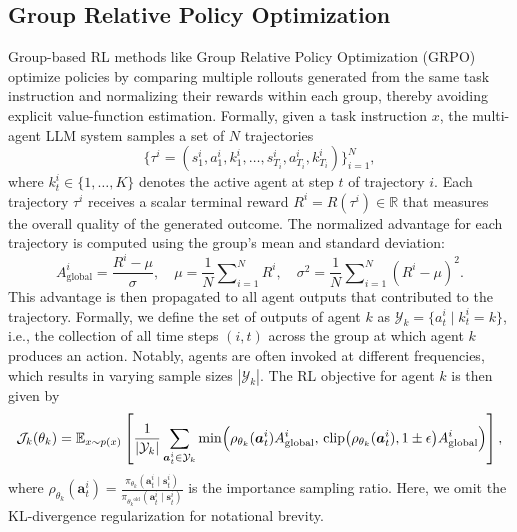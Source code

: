 \subsection{Group Relative Policy Optimization}
Group-based RL methods like Group Relative Policy Optimization (GRPO)~\citep{shao2024deepseekmath} optimize policies by comparing multiple rollouts generated from the same task instruction and normalizing their rewards within each group, thereby avoiding explicit value-function estimation. 
Formally, given a task instruction $x$, the multi-agent LLM system samples a set of $N$ trajectories
\begin{equation}
    \{\tau^i = (s_1^i, a_1^i, k_1^i, \dots, s_{T_i}^i, a_{T_i}^i, k_{T_i}^i)\}_{i=1}^N,
\end{equation}
where $k_t^i \in \{1,\dots,K\}$ denotes the active agent at step $t$ of trajectory $i$.  
Each trajectory $\tau^i$ receives a scalar terminal reward $R^i = R(\tau^i) \in \mathbb{R}$ that measures the overall quality of the generated outcome. 
The normalized advantage for each trajectory is computed using the group’s mean and standard deviation:
\begin{equation}
    A^i_{\text{global}} = \frac{R^i - \mu}{\sigma}, 
    \quad 
    \mu = \frac{1}{N}\sum\nolimits_{i=1}^N R^i, 
    \quad 
    \sigma^2 = \frac{1}{N}\sum\nolimits_{i=1}^N (R^i - \mu)^2.
\end{equation}
This advantage is then propagated to all agent outputs that contributed to the trajectory. Formally, we define the set of outputs of agent $k$ as $\mathcal{Y}_k = \{a_t^i \mid k_t^i = k\}$, i.e., the collection of all time steps $(i,t)$ across the group at which agent $k$ produces an action. Notably, agents are often invoked at different frequencies, which results in varying sample sizes $|\mathcal{Y}_k|$.
The RL objective for agent $k$ is then given by
\begin{equation}
    \mathcal{J}_k(\theta_k)
    = \mathbb{E}_{x\sim p(x)}\left[
      \frac{1}{|\mathcal{Y}_k|}
      \sum_{\bm{a}_t^i\in \mathcal{Y}_k}
      \min\Bigl(
        \rho_{\theta_k}(\bm{a}_t^{i}) A^i_{\text{global}},
        \,
        \text{clip}\bigl(\rho_{\theta_k}(\bm{a}_t^{i}), 1 \pm \epsilon\bigr) A^i_{\text{global}}
      \Bigr)
    \right],
\end{equation}
where $\rho_{\theta_k}(\bm{a}_t^{i}) = \frac{\pi_{\theta_k}(\bm{a}_t^{i} \mid \bm{s}_t^{i})}{\pi_{{\theta_k}^{\text{old}}}(\bm{a}_t^i \mid \bm{s}_t^i)}$ is the importance sampling ratio. Here, we omit the KL-divergence regularization for notational brevity.